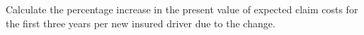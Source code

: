 \medskip
Calculate the percentage increase in the present value of expected claim costs for the first three years per new insured driver due to the change.
\showsol{\bsoln
\[ \begin{array}{c} \text{L} \\  \text{M} \\  \text{H} \end{array}
   \qquad Q = \left[\begin{array}{ccc} 0.7 & 0.3 & 0 \\ 0.2 & 0.4 & 0.4 \\ 0 & 0 & 1 \end{array}\right] 
   \qquad Q^2 = \left[\begin{array}{ccc} 0.55 & 0.33 & 0.12 \\ 0.22 & 0.22 & 0.56 \\ 0 & 0 & 1 \end{array}\right]   
\]
}
